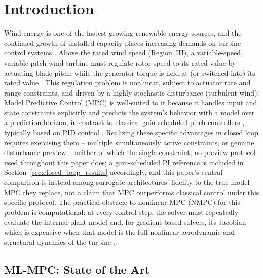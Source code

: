 
\section{Introduction}
\label{sec:introduction}

Wind energy is one of the fastest-growing renewable energy sources, and
the continued growth of installed capacity places increasing demands on
turbine control systems \cite{pao2009}. Above the rated wind speed
(Region~III), a variable-speed, variable-pitch wind turbine must regulate
rotor speed to its rated value by actuating blade pitch, while the
generator torque is held at (or switched into) its rated value
\cite{bianchi2006}. {\color{auditP2}This regulation problem is nonlinear, subject to
actuator rate and range constraints, and driven by a highly stochastic
disturbance (turbulent wind); Model Predictive Control (MPC) is
well-suited to it because it handles input and state constraints
explicitly \cite{rawlings2017} and predicts the system's behavior with a
model over a prediction horizon, in contrast to classical gain-scheduled
pitch controllers \cite{bianchi2006,pao2009}, typically based on PID
control \cite{laks2009}.} Realizing these
specific advantages in closed loop requires exercising them --
multiple simultaneously active constraints, or genuine disturbance
preview -- neither of which the single-constraint, no-preview
protocol used throughout this paper does; a gain-scheduled PI
reference is included in Section~\ref{sec:closed_loop_results}
accordingly, and this paper's central comparison is instead among
surrogate architectures' fidelity to the true-model MPC they replace,
not a claim that MPC outperforms classical control under this
specific protocol. {\color{auditP2}The practical obstacle to
nonlinear MPC (NMPC) for this problem is computational: at every control
step, the solver must repeatedly evaluate the internal plant model and,
for gradient-based solvers, its Jacobian which is expensive when that
model is the full nonlinear aerodynamic and structural dynamics of the
turbine \cite{schlipf2013}.}

\subsection{ML-MPC: State of the Art}
\label{subsec:soa}

